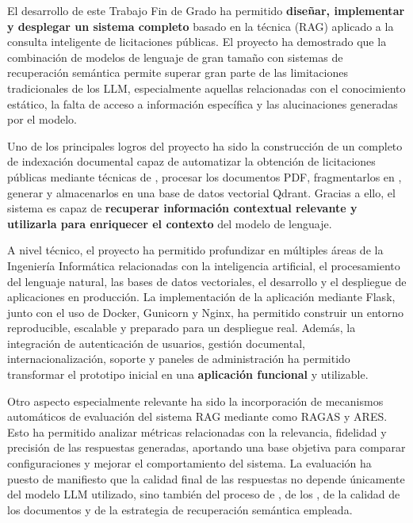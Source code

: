 
El desarrollo de este Trabajo Fin de Grado ha permitido \textbf{diseñar, implementar y desplegar un sistema completo} basado en la técnica  (RAG) aplicado a la consulta inteligente de licitaciones públicas. El proyecto ha demostrado que la combinación de modelos de lenguaje de gran tamaño con sistemas de recuperación semántica permite superar gran parte de las limitaciones tradicionales de los LLM, especialmente aquellas relacionadas con el conocimiento estático, la falta de acceso a información específica y las alucinaciones generadas por el modelo.

Uno de los principales logros del proyecto ha sido la construcción de un  completo de indexación documental capaz de automatizar la obtención de licitaciones públicas mediante técnicas de , procesar los documentos PDF, fragmentarlos en , generar  y almacenarlos en una base de datos vectorial Qdrant. Gracias a ello, el sistema es capaz de \textbf{recuperar información contextual relevante y utilizarla para enriquecer el contexto} del modelo de lenguaje.

A nivel técnico, el proyecto ha permitido profundizar en múltiples áreas de la Ingeniería Informática relacionadas con la inteligencia artificial, el procesamiento del lenguaje natural, las bases de datos vectoriales, el desarrollo  y el despliegue de aplicaciones en producción. La implementación de la aplicación  mediante Flask, junto con el uso de Docker, Gunicorn y Nginx, ha permitido construir un entorno reproducible, escalable y preparado para un despliegue real. Además, la integración de autenticación de usuarios, gestión documental, internacionalización, soporte  y paneles de administración ha permitido transformar el prototipo inicial en una \textbf{aplicación funcional} y utilizable.

Otro aspecto especialmente relevante ha sido la incorporación de mecanismos automáticos de evaluación del sistema RAG mediante  como RAGAS y ARES. Esto ha permitido analizar métricas relacionadas con la relevancia, fidelidad y precisión de las respuestas generadas, aportando una base objetiva para comparar configuraciones y mejorar el comportamiento del sistema. La evaluación ha puesto de manifiesto que la calidad final de las respuestas no depende únicamente del modelo LLM utilizado, sino también del proceso de , de los , de la calidad de los documentos y de la estrategia de recuperación semántica empleada.

